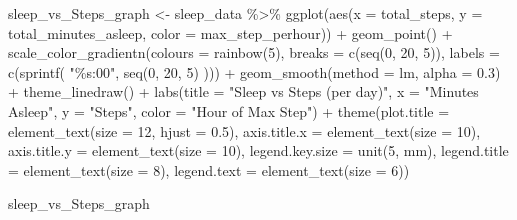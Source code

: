 \documentclass[
]{article}
\newenvironment{Shaded}{\begin{snugshade}}{\end{snugshade}}
\newcommand{\AttributeTok}[1]{\textcolor[rgb]{0.77,0.63,0.00}{#1}}
\newcommand{\DecValTok}[1]{\textcolor[rgb]{0.00,0.00,0.81}{#1}}
\newcommand{\FloatTok}[1]{\textcolor[rgb]{0.00,0.00,0.81}{#1}}
\newcommand{\FunctionTok}[1]{\textcolor[rgb]{0.00,0.00,0.00}{#1}}
\newcommand{\NormalTok}[1]{#1}
\newcommand{\OtherTok}[1]{\textcolor[rgb]{0.56,0.35,0.01}{#1}}
\newcommand{\SpecialCharTok}[1]{\textcolor[rgb]{0.00,0.00,0.00}{#1}}
\newcommand{\StringTok}[1]{\textcolor[rgb]{0.31,0.60,0.02}{#1}}
\begin{document}
\begin{Shaded}
\begin{Highlighting}[]
\NormalTok{ sleep\_vs\_Steps\_graph }\OtherTok{\textless{}{-}}\NormalTok{ sleep\_data }\SpecialCharTok{\%\textgreater{}\%} 
   \FunctionTok{ggplot}\NormalTok{(}\FunctionTok{aes}\NormalTok{(}\AttributeTok{x =}\NormalTok{ total\_steps, }\AttributeTok{y =}\NormalTok{ total\_minutes\_asleep, }\AttributeTok{color =}\NormalTok{ max\_step\_perhour)) }\SpecialCharTok{+}
   \FunctionTok{geom\_point}\NormalTok{() }\SpecialCharTok{+}
   \FunctionTok{scale\_color\_gradientn}\NormalTok{(}\AttributeTok{colours =} \FunctionTok{rainbow}\NormalTok{(}\DecValTok{5}\NormalTok{),}
                         \AttributeTok{breaks =} \FunctionTok{c}\NormalTok{(}\FunctionTok{seq}\NormalTok{(}\DecValTok{0}\NormalTok{, }\DecValTok{20}\NormalTok{, }\DecValTok{5}\NormalTok{)),}
                         \AttributeTok{labels =} \FunctionTok{c}\NormalTok{(}\FunctionTok{sprintf}\NormalTok{(}
                           \StringTok{"\%s:00"}\NormalTok{,}
                           \FunctionTok{seq}\NormalTok{(}\DecValTok{0}\NormalTok{, }\DecValTok{20}\NormalTok{, }\DecValTok{5}\NormalTok{)}
\NormalTok{                         ))) }\SpecialCharTok{+}
   \FunctionTok{geom\_smooth}\NormalTok{(}\AttributeTok{method =}\NormalTok{ lm, }\AttributeTok{alpha =} \FloatTok{0.3}\NormalTok{) }\SpecialCharTok{+}
   \FunctionTok{theme\_linedraw}\NormalTok{() }\SpecialCharTok{+}
   \FunctionTok{labs}\NormalTok{(}\AttributeTok{title =} \StringTok{"Sleep vs Steps (per day)"}\NormalTok{, }
        \AttributeTok{x =} \StringTok{"Minutes Asleep"}\NormalTok{, }\AttributeTok{y =} \StringTok{"Steps"}\NormalTok{,}
        \AttributeTok{color =} \StringTok{"Hour of Max Step"}\NormalTok{) }\SpecialCharTok{+}
   \FunctionTok{theme}\NormalTok{(}\AttributeTok{plot.title =} \FunctionTok{element\_text}\NormalTok{(}\AttributeTok{size =} \DecValTok{12}\NormalTok{, }\AttributeTok{hjust =} \FloatTok{0.5}\NormalTok{),}
         \AttributeTok{axis.title.x =} \FunctionTok{element\_text}\NormalTok{(}\AttributeTok{size =} \DecValTok{10}\NormalTok{),}
         \AttributeTok{axis.title.y =} \FunctionTok{element\_text}\NormalTok{(}\AttributeTok{size =} \DecValTok{10}\NormalTok{),}
         \AttributeTok{legend.key.size =} \FunctionTok{unit}\NormalTok{(}\DecValTok{5}\NormalTok{, }\StringTok{\textquotesingle{}mm\textquotesingle{}}\NormalTok{),}
         \AttributeTok{legend.title =} \FunctionTok{element\_text}\NormalTok{(}\AttributeTok{size =} \DecValTok{8}\NormalTok{),}
         \AttributeTok{legend.text =} \FunctionTok{element\_text}\NormalTok{(}\AttributeTok{size =} \DecValTok{6}\NormalTok{)) }
 
\NormalTok{ sleep\_vs\_Steps\_graph}
\end{Highlighting}
\end{Shaded}
\end{document}
